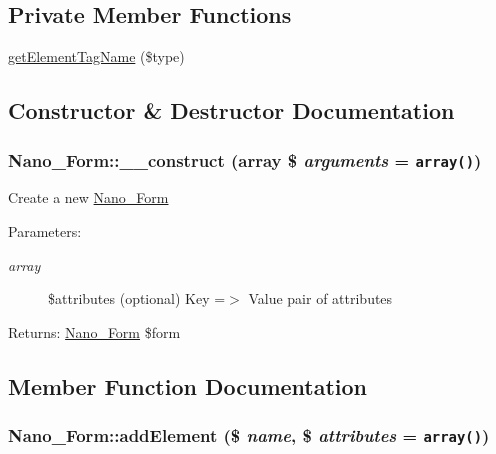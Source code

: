 \subsection*{Private Member Functions}
\begin{CompactItemize}
\item 
\hyperlink{classNano__Form_24c1ecefa8685c173cebb0676215e5a0}{getElementTagName} (\$type)
\end{CompactItemize}


\subsection{Constructor \& Destructor Documentation}
\hypertarget{classNano__Form_f574966ae982f1bcf5703966992d946f}{
\subsubsection[{\_\-\_\-construct}]{\setlength{\rightskip}{0pt plus 5cm}Nano\_\-Form::\_\-\_\-construct (array \$ {\em arguments} = {\tt array()})}}
\label{classNano__Form_f574966ae982f1bcf5703966992d946f}


Create a new \hyperlink{classNano__Form}{Nano\_\-Form}

\begin{Desc}
\item[Parameters:]
\begin{description}
\item[{\em array}]\$attributes (optional) Key =$>$ Value pair of attributes \end{description}
\end{Desc}
\begin{Desc}
\item[Returns:]\hyperlink{classNano__Form}{Nano\_\-Form} \$form \end{Desc}


\subsection{Member Function Documentation}
\hypertarget{classNano__Form_3e71c491f18020b5c574eb7e230e21d0}{
\subsubsection[{addElement}]{\setlength{\rightskip}{0pt plus 5cm}Nano\_\-Form::addElement (\$ {\em name}, \/  \$ {\em attributes} = {\tt array()})}}
\label{classNano__Form_3e71c491f18020b5c574eb7e230e21d0}


